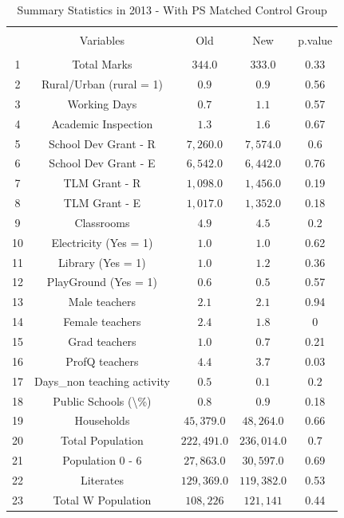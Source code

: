 \documentclass[12pt, a4paper]{article}
\begin{document}
\begin{table}[!htbp] \centering 
  \caption{Summary Statistics in 2013 - With PS Matched Control Group} 
  \label{} 
\begin{tabular}{@{\extracolsep{5pt}} ccccc} 
\\[-1.8ex]\hline 
\hline \\[-1.8ex] 
 & Variables & Old & New & p.value \\ 
\hline \\[-1.8ex] 
1 & Total Marks & $344.0$ & $333.0$ & 0.33 \\ 
2 & Rural/Urban (rural = 1) & $0.9$ & $0.9$ & 0.56 \\ 
3 & Working Days & $0.7$ & $1.1$ & 0.57 \\ 
4 & Academic Inspection & $1.3$ & $1.6$ & 0.67 \\ 
5 & School Dev Grant - R & $7,260.0$ & $7,574.0$ & 0.6 \\ 
6 & School Dev Grant - E & $6,542.0$ & $6,442.0$ & 0.76 \\ 
7 & TLM Grant - R & $1,098.0$ & $1,456.0$ & 0.19 \\ 
8 & TLM Grant - E & $1,017.0$ & $1,352.0$ & 0.18 \\ 
9 & Classrooms & $4.9$ & $4.5$ & 0.2 \\ 
10 & Electricity (Yes = 1) & $1.0$ & $1.0$ & 0.62 \\ 
11 & Library  (Yes = 1) & $1.0$ & $1.2$ & 0.36 \\ 
12 & PlayGround  (Yes = 1) & $0.6$ & $0.5$ & 0.57 \\ 
13 & Male teachers & $2.1$ & $2.1$ & 0.94 \\ 
14 & Female teachers & $2.4$ & $1.8$ & 0 \\ 
15 & Grad teachers & $1.0$ & $0.7$ & 0.21 \\ 
16 & ProfQ teachers & $4.4$ & $3.7$ & 0.03 \\ 
17 & Days\_non teaching activity & $0.5$ & $0.1$ & 0.2 \\ 
18 & Public Schools (\textbackslash \%) & $0.8$ & $0.9$ & 0.18 \\ 
19 & Households & $45,379.0$ & $48,264.0$ & 0.66 \\ 
20 & Total Population & $222,491.0$ & $236,014.0$ & 0.7 \\ 
21 & Population 0 - 6 & $27,863.0$ & $30,597.0$ & 0.69 \\ 
22 & Literates & $129,369.0$ & $119,382.0$ & 0.53 \\ 
23 & Total W Population & $108,226$ & $121,141$ & 0.44 \\ 

\end{tabular}
\end{table}
\end{document}
